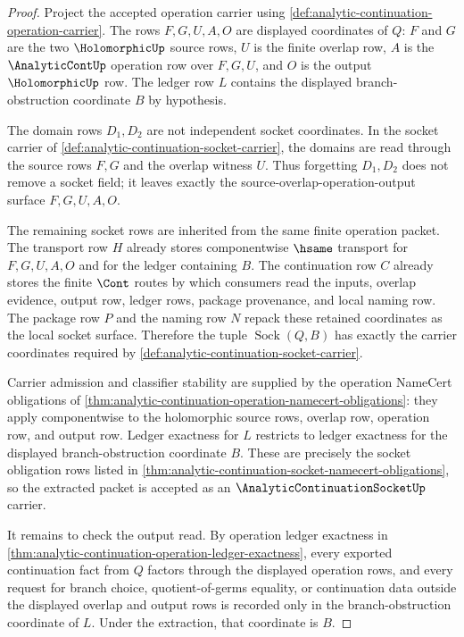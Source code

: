 \begin{proof}
Project the accepted operation carrier using \autoref{def:analytic-continuation-operation-carrier}. The rows $F,G,U,A,O$ are displayed coordinates of $Q$: $F$ and $G$ are the two $\HolomorphicUp$ source rows, $U$ is the finite overlap row, $A$ is the $\AnalyticContUp$ operation row over $F,G,U$, and $O$ is the output $\HolomorphicUp$ row. The ledger row $L$ contains the displayed branch-obstruction coordinate $B$ by hypothesis.

The domain rows $D_1,D_2$ are not independent socket coordinates. In the socket carrier of \autoref{def:analytic-continuation-socket-carrier}, the domains are read through the source rows $F,G$ and the overlap witness $U$. Thus forgetting $D_1,D_2$ does not remove a socket field; it leaves exactly the source-overlap-operation-output surface $F,G,U,A,O$.

The remaining socket rows are inherited from the same finite operation packet. The transport row $H$ already stores componentwise $\hsame$ transport for $F,G,U,A,O$ and for the ledger containing $B$. The continuation row $C$ already stores the finite $\Cont$ routes by which consumers read the inputs, overlap evidence, output row, ledger rows, package provenance, and local naming row. The package row $P$ and the naming row $N$ repack these retained coordinates as the local socket surface. Therefore the tuple $\operatorname{Sock}(Q,B)$ has exactly the carrier coordinates required by \autoref{def:analytic-continuation-socket-carrier}.

Carrier admission and classifier stability are supplied by the operation NameCert obligations of \autoref{thm:analytic-continuation-operation-namecert-obligations}: they apply componentwise to the holomorphic source rows, overlap row, operation row, and output row. Ledger exactness for $L$ restricts to ledger exactness for the displayed branch-obstruction coordinate $B$. These are precisely the socket obligation rows listed in \autoref{thm:analytic-continuation-socket-namecert-obligations}, so the extracted packet is accepted as an $\AnalyticContinuationSocketUp$ carrier.

It remains to check the output read. By operation ledger exactness in \autoref{thm:analytic-continuation-operation-ledger-exactness}, every exported continuation fact from $Q$ factors through the displayed operation rows, and every request for branch choice, quotient-of-germs equality, or continuation data outside the displayed overlap and output rows is recorded only in the branch-obstruction coordinate of $L$. Under the extraction, that coordinate is $B$.


\end{proof}
